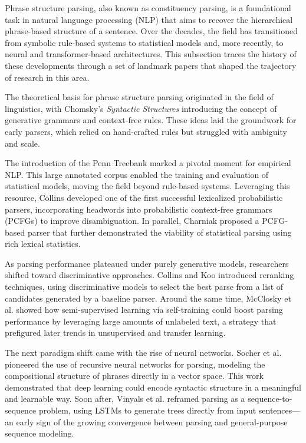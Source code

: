 Phrase structure parsing, also known as constituency parsing, is a foundational task in natural language processing (NLP) that aims to recover the hierarchical phrase-based structure of a sentence. Over the decades, the field has transitioned from symbolic rule-based systems to statistical models and, more recently, to neural and transformer-based architectures. This subsection traces the history of these developments through a set of landmark papers that shaped the trajectory of research in this area.

The theoretical basis for phrase structure parsing originated in the field of linguistics, with Chomsky's \textit{Syntactic Structures} \cite{chomsky1957syntactic} introducing the concept of generative grammars and context-free rules. These ideas laid the groundwork for early parsers, which relied on hand-crafted rules but struggled with ambiguity and scale.

The introduction of the Penn Treebank \cite{marcus1993building} marked a pivotal moment for empirical NLP. This large annotated corpus enabled the training and evaluation of statistical models, moving the field beyond rule-based systems. Leveraging this resource, Collins \cite{collins1997three} developed one of the first successful lexicalized probabilistic parsers, incorporating headwords into probabilistic context-free grammars (PCFGs) to improve disambiguation. In parallel, Charniak \cite{charniak1997statistical} proposed a PCFG-based parser that further demonstrated the viability of statistical parsing using rich lexical statistics.

As parsing performance plateaued under purely generative models, researchers shifted toward discriminative approaches. Collins and Koo \cite{collins2005discriminative} introduced reranking techniques, using discriminative models to select the best parse from a list of candidates generated by a baseline parser. Around the same time, McClosky et al. \cite{mcclosky2006effective} showed how semi-supervised learning via self-training could boost parsing performance by leveraging large amounts of unlabeled text, a strategy that prefigured later trends in unsupervised and transfer learning.

The next paradigm shift came with the rise of neural networks. Socher et al. \cite{socher2013parsing} pioneered the use of recursive neural networks for parsing, modeling the compositional structure of phrases directly in a vector space. This work demonstrated that deep learning could encode syntactic structure in a meaningful and learnable way. Soon after, Vinyals et al. \cite{vinyals2015grammar} reframed parsing as a sequence-to-sequence problem, using LSTMs to generate trees directly from input sentences—an early sign of the growing convergence between parsing and general-purpose sequence modeling.

